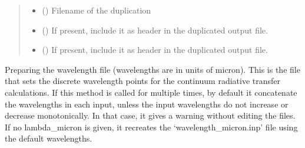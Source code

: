 \documentclass[a4paper,11pt,english]{sphinxmanual}
\begin{document}
\begin{fulllineitems}
\begin{fulllineitems}
\begin{quote}
\begin{description}
\begin{itemize}
\item {} 
\sphinxAtStartPar
{} () \textendash{} Filename of the duplication

\item {} 
\sphinxAtStartPar
{} () \textendash{} If present, include it as header in the duplicated output file.

\item {} 
\sphinxAtStartPar
{} () \textendash{} If present, include it as header in the duplicated output file.

\end{itemize}

\end{description}\end{quote}

\end{fulllineitems}


\begin{fulllineitems}
\label{\detokenize{radmc3d:setup.radmc3d_setup.get_continuumlambda}}
\pysigstartsignatures
\pysiglinewithargsret
{}
{\sphinxparamcomma {}\sphinxparamcomma {}\sphinxparamcomma {}\sphinxparamcomma {}}
{}
\pysigstopsignatures
\sphinxAtStartPar
Preparing the wavelength file (wavelengths are in units of micron).
This is the file that sets the discrete wavelength points for the continuum radiative transfer calculations.
If this method is called for multiple times, by default it concatenate the wavelengths in each input,
unless the input wavelengths do not increase or decrease monotonically.
In that case, it gives a warning without editing the files.
If no lambda\_micron is given, it recreates the ‘wavelength\_micron.inp’ file using the default wavelengths.


\end{fulllineitems}
\end{fulllineitems}
\end{document}
